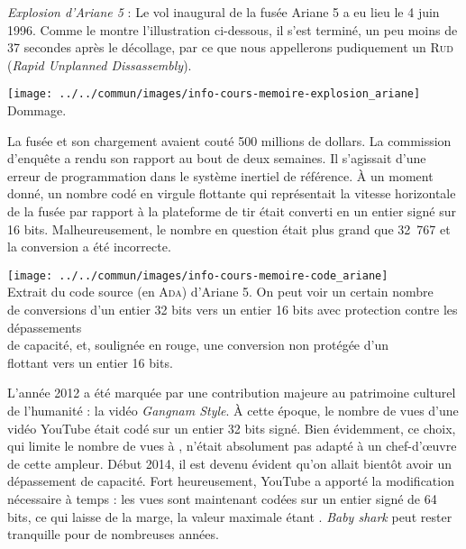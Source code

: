 \documentclass{magnolia}
\begin{document}
\begin{remarques}
  \remarque \emph{Explosion d'Ariane 5} :
  Le vol inaugural de la fusée Ariane 5 a eu lieu le 4 juin 1996.
  Comme le montre l'illustration ci-dessous, il s'est terminé, un peu
  moins de 37 secondes après le décollage, par ce que nous appellerons
  pudiquement un \textsc{Rud} (\emph{Rapid Unplanned Dissassembly}).
  \begin{center}
    \texttt{[image: ../../commun/images/info-cours-memoire-explosion\_ariane]}\\
    Dommage.
  \end{center}
  \vspace{1ex}
  La fusée et son chargement avaient couté 500
  millions de dollars. La commission d'enquête a rendu son rapport au bout de
  deux semaines. Il s'agissait d'une erreur de programmation dans le système
  inertiel de référence. À un moment donné, un nombre codé en virgule flottante
  qui représentait la vitesse horizontale de la fusée par rapport à la
  plateforme de tir était converti en un entier signé sur 16 bits. Malheureusement, le
  nombre en question était plus grand que 32\ 767 et la conversion a été incorrecte.
  \vspace{1ex}
  \begin{center}
    \texttt{[image: ../../commun/images/info-cours-memoire-code\_ariane]}\\
    Extrait du code source (en \textsc{Ada}) d'Ariane 5. On peut voir
      un certain nombre\\ de conversions d'un entier 32 bits
      vers un entier 16 bits
      avec protection contre les dépassements\\ de
      capacité, et, soulignée en rouge, une conversion  non protégée d'un\\ flottant vers
      un entier 16 bits.
  \end{center}
  \remarque
    L'année 2012 a été marquée par une contribution majeure au patrimoine
    culturel de l'humanité : la vidéo \emph{Gangnam Style}. À cette
    époque, le nombre de vues d'une vidéo YouTube était codé 
    sur un entier 32 bits signé.
    Bien évidemment, ce choix, qui limite le nombre de vues à
    , n'était absolument pas adapté à un
    chef-d'œuvre de cette ampleur. Début 2014, il est devenu évident
    qu'on allait bientôt avoir un dépassement de capacité. Fort heureusement,
    YouTube a apporté la modification nécessaire à temps : les vues sont
    maintenant codées sur un entier signé de 64 bits, ce qui laisse de la marge, la valeur maximale étant
    . \emph{Baby shark} peut rester
    tranquille pour de nombreuses années.
  \end{remarques}
\end{document}
